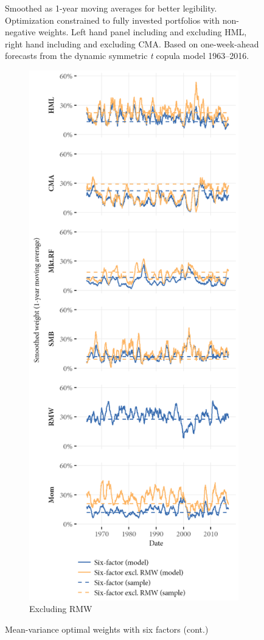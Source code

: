 \begin{figure}[p]
  \begin{longcaption}
    Smoothed as 1-year moving averages for better legibility. Optimization constrained to fully invested portfolios with non-negative weights. Left hand panel including and excluding HML, right hand including and excluding CMA. Based on one-week-ahead forecasts from the dynamic symmetric \emph{t} copula model 1963--2016.
  \end{longcaption}
\end{figure}

\begin{figure}[p]
  \ContinuedFloat
  \centering
  \begin{subfigure}{0.45\textwidth}
    \includegraphics[width=\textwidth]{graphics/weights/main_Weights_MV_6F_6F_EXCL_RMW.png}
    \caption{Excluding RMW}
  \end{subfigure}
  \footnotesize
  \caption{Mean-variance optimal weights with six factors (cont.)}
  \label{fig:mv_optimal_6}
\end{figure}



\FloatBarrier


